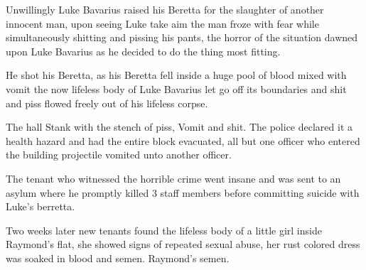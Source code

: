 Unwillingly Luke Bavarius raised his Beretta for the slaughter of
another innocent man, upon seeing Luke take aim the man froze with
fear while simultaneously shitting and pissing his pants, the
horror of the situation dawned upon Luke Bavarius as he decided to
do the thing most fitting.



He shot his Beretta, as his Beretta fell inside a huge pool of
blood mixed with vomit the now lifeless body of Luke Bavarius let
go off its boundaries and shit and piss flowed freely out of his
lifeless corpse.



The hall Stank with the stench of piss, Vomit and shit. The police
declared it a health hazard and had the entire block evacuated, all
but one officer who entered the building projectile vomited unto
another officer.



The tenant who witnessed the horrible crime went insane and was
sent to an asylum where he promptly killed 3 staff members before
committing suicide with Luke's berretta.



Two weeks later new tenants found the lifeless body of a little
girl inside Raymond's flat, she showed signs of repeated
sexual abuse, her rust colored dress was soaked in blood and semen.
Raymond's semen.


 



